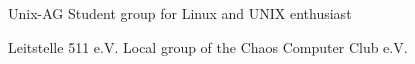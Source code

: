 

\begin{cvskills}

  \cvskill
    {Unix-AG} %
    {Student group for Linux and UNIX enthusiast} %

  \cvskill
    {Leitstelle 511 e.V.} %
    {Local group of the Chaos Computer Club e.V.} %

\end{cvskills}
